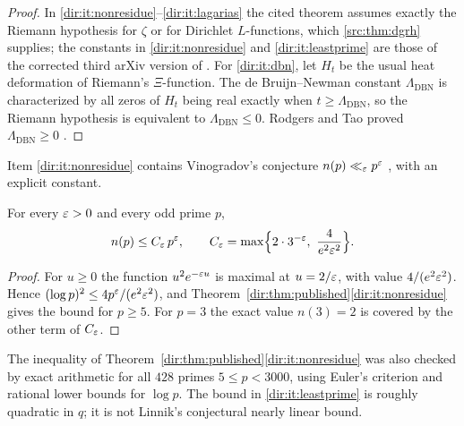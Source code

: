 \begin{proof}
In \ref{dir:it:nonresidue}--\ref{dir:it:lagarias} the cited theorem assumes exactly the
Riemann hypothesis for $\zeta$ or for Dirichlet $L$-functions, which
\cref{src:thm:dgrh} supplies; the constants in \ref{dir:it:nonresidue} and
\ref{dir:it:leastprime} are those of the corrected third arXiv version of
\cite{LamzouriLiSoundararajan2015Conditional}. For \ref{dir:it:dbn}, let $H_t$ be the
usual heat deformation of Riemann's $\Xi$-function. The de Bruijn--Newman constant
$\Lambda_{\mathrm{DBN}}$ is characterized by all zeros of $H_t$ being real exactly when
$t\ge\Lambda_{\mathrm{DBN}}$, so the Riemann hypothesis is equivalent to
$\Lambda_{\mathrm{DBN}}\le0$. Rodgers and Tao proved $\Lambda_{\mathrm{DBN}}\ge0$
\cite{RodgersTao2020Bruijn}.
\end{proof}

Item \ref{dir:it:nonresidue} contains Vinogradov's conjecture
$n(p)\ll_\varepsilon p^{\varepsilon}$ \cite{Tao2015Elliott}, with an explicit constant.

\begin{corollary}
\label{dir:cor:vinogradov}
For every $\varepsilon>0$ and every odd prime $p$,
\[
 n(p)\le C_\eps\,p^{\eps},\qquad
 C_\eps=\max\Bigl\{2\cdot3^{-\eps},\ \frac{4}{e^2\eps^2}\Bigr\}.
\]
\end{corollary}

\begin{proof}
For $u\ge0$ the function $u^2e^{-\varepsilon u}$ is maximal at $u=2/\varepsilon$, with value
$4/(e^2\varepsilon^2)$. Hence $(\log p)^2\le 4p^{\varepsilon}/(e^2\varepsilon^2)$, and
Theorem~\ref{dir:thm:published}\ref{dir:it:nonresidue} gives the bound for $p\ge5$. For $p=3$
the exact value $n(3)=2$ is covered by the other term of $C_\varepsilon$.
\end{proof}

The inequality of Theorem~\ref{dir:thm:published}\ref{dir:it:nonresidue} was also checked by
exact arithmetic for all $428$ primes $5\le p<3000$, using Euler's criterion and
rational lower bounds for $\log p$. The bound in \ref{dir:it:leastprime} is roughly
quadratic in $q$; it is not Linnik's conjectural nearly linear bound.

